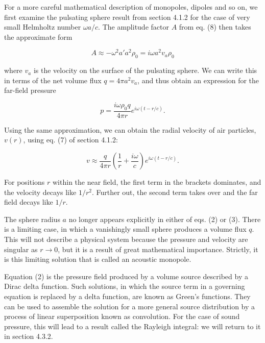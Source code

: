   For a more careful mathematical description of monopoles, dipoles and so on, 
  we first examine the pulsating sphere result from section 4.1.2 for the case 
  of very small Helmholtz number $\omega a/c$. The amplitude factor $A$ from 
  eq. (8) then takes the approximate form 

  \begin{equation*}A \approx -\omega^2 a' a^2 \rho_0 = i \omega a^2 v_a \rho_0 
  \tag{1}\end{equation*} 

  \noindent{}where $v_a$ is the velocity on the surface of the pulsating 
  sphere. We can write this in terms of the net volume flux $q=4 \pi a^2 v_a$, 
  and thus obtain an expression for the far-field pressure 

  \begin{equation*}p=\dfrac{i \omega \rho_0 q}{4 \pi r} e^{i \omega(t-r/c)} . 
  \tag{2}\end{equation*} 

  Using the same approximation, we can obtain the radial velocity of air 
  particles, $v(r)$, using eq. (7) of section 4.1.2: 

  \begin{equation*}v \approx \dfrac{q}{4 \pi r} \left( \dfrac{1}{r} + \dfrac{i 
  \omega}{c} \right) e^{i \omega(t-r/c)} . \tag{3}\end{equation*} 

  For positions $r$ within the near field, the first term in the brackets 
  dominates, and the velocity decays like $1/r^2$. Further out, the second term 
  takes over and the far field decays like $1/r$. 

  The sphere radius $a$ no longer appears explicitly in either of eqs. (2) or 
  (3). There is a limiting case, in which a vanishingly small sphere produces a 
  volume flux $q$. This will not describe a physical system because the 
  pressure and velocity are singular as $r \rightarrow 0$, but it is a result 
  of great mathematical importance. Strictly, it is this limiting solution that 
  is called an acoustic monopole. 

  Equation (2) is the pressure field produced by a volume source described by a 
  Dirac delta function. Such solutions, in which the source term in a governing 
  equation is replaced by a delta function, are known as Green's functions. 
  They can be used to assemble the solution for a more general source 
  distribution by a process of linear superposition known as convolution. For 
  the case of sound pressure, this will lead to a result called the Rayleigh 
  integral: we will return to it in section 4.3.2. 

